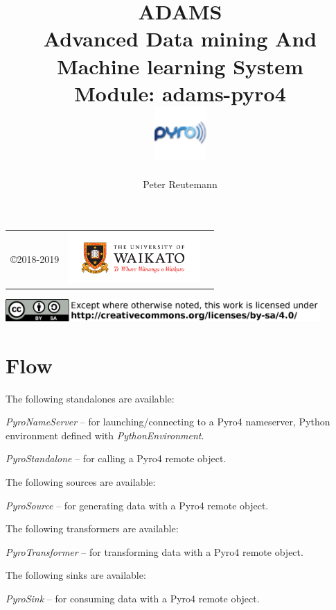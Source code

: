 \documentclass[a4paper]{book}
\title{
  \textbf{ADAMS} \\
  {\Large \textbf{A}dvanced \textbf{D}ata mining \textbf{A}nd \textbf{M}achine
  learning \textbf{S}ystem} \\
  {\Large Module: adams-pyro4} \\
  \vspace{1cm}
  \includegraphics[width=2cm]{images/pyro4-module.png} \\
}
\author{
  Peter Reutemann
}
\begin{document}
\begin{titlepage}
\maketitle

\thispagestyle{empty}
\center
\begin{table}[b]
	\begin{tabular}{c l l}
		\parbox[c][2cm]{2cm}{\copyright 2018-2019} &
		\parbox[c][2cm]{5cm}{\includegraphics[width=5cm]{images/coat_of_arms.pdf}}
	\end{tabular}
	\includegraphics[width=12cm]{images/cc.png} \\
\end{table}

\end{titlepage}

\tableofcontents

\chapter{Flow}

The following standalones are available:
\begin{tight_itemize}
  \item \textit{PyroNameServer} -- for launching/connecting to a Pyro4\cite{pyro4} nameserver, Python environment
  defined with \textit{PythonEnvironment}.
  \item \textit{PyroStandalone} -- for calling a Pyro4\cite{pyro4} remote object.
\end{tight_itemize}

The following sources are available:
\begin{tight_itemize}
  \item \textit{PyroSource} -- for generating data with a Pyro4\cite{pyro4} remote object.

\end{tight_itemize}

The following transformers are available:
\begin{tight_itemize}
  \item \textit{PyroTransformer} -- for transforming data with a Pyro4\cite{pyro4} remote object.
\end{tight_itemize}

The following sinks are available:
\begin{tight_itemize}
  \item \textit{PyroSink} -- for consuming data with a Pyro4\cite{pyro4} remote object.
\end{tight_itemize}



\end{document}
